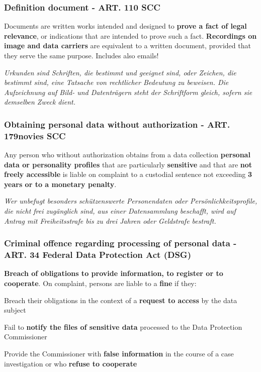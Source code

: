 \subsubsection{Definition document - ART. 110 SCC}
Documents are written works intended and designed to \textbf{prove a fact of legal relevance}, or indications that are intended to prove such a fact.\textbf{ Recordings on image and data carriers} are equivalent to a written document, provided that they serve the same purpose. Includes also emails!

\textit{Urkunden sind Schriften, die bestimmt und geeignet sind, oder Zeichen, die bestimmt sind, eine Tatsache von rechtlicher Bedeutung zu beweisen. Die Aufzeichnung auf Bild- und Datenträgern steht der Schriftform gleich, sofern sie demselben Zweck dient.}

\subsubsection{Obtaining personal data without authorization - ART. 179novies SCC}
Any person who without authorization obtains from a data collection \textbf{personal data or personality profiles} that are particularly \textbf{sensitive} and that are \textbf{not freely accessible} is liable on complaint to a custodial sentence not exceeding \textbf{3 years or to a monetary penalty}.

\textit{Wer unbefugt besonders schützenswerte Personendaten oder Persönlichkeitsprofile, die nicht frei zugänglich sind, aus einer Datensammlung beschafft, wird auf Antrag mit Freiheitsstrafe bis zu drei Jahren oder Geldstrafe bestraft.}

\subsubsection{Criminal offence regarding processing of personal data - ART. 34 Federal Data Protection Act (DSG)}
\textbf{Breach of obligations to provide information, to register or to cooperate}. On complaint, persons are liable to a \textbf{fine} if they:
\begin{compactitem}
	\item Breach their obligations in the context of a \textbf{request to access} by the data subject
	\item Fail to \textbf{notify the files of sensitive data} processed to the Data Protection Commissioner
	\item Provide the Commissioner with \textbf{false information} in the course of a case investigation or who \textbf{refuse to cooperate}
\end{compactitem}

